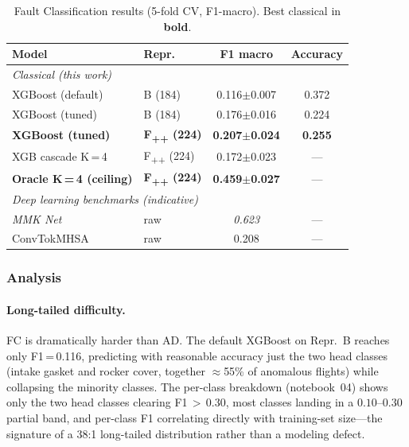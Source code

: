 \begin{table}[H]
    \centering
    \caption{Fault Classification results (5-fold CV, F1-macro). Best classical
             in \textbf{bold}.}
    \label{tab:fc_results}
    \begin{tabular}{llcc}
        \toprule
        \textbf{Model} & \textbf{Repr.} & \textbf{F1 macro} & \textbf{Accuracy} \\
        \midrule
        \multicolumn{4}{l}{\textit{Classical (this work)}} \\
        XGBoost (default)        & B (184)   & 0.116$\pm$0.007 & 0.372 \\
        XGBoost (tuned)          & B (184)   & 0.176$\pm$0.016 & 0.224 \\
        \textbf{XGBoost (tuned)} & \textbf{F\textsubscript{++} (224)} & \textbf{0.207$\pm$0.024} & \textbf{0.255} \\
        XGB cascade K\,=\,4      & F\textsubscript{++} (224) & 0.172$\pm$0.023 & --- \\
        \textbf{Oracle K\,=\,4 (ceiling)} & \textbf{F\textsubscript{++} (224)} & \textbf{0.459$\pm$0.027} & --- \\
        \midrule
        \multicolumn{4}{l}{\textit{Deep learning benchmarks (indicative) \cite{lmsd2025}}} \\
        \textit{MMK Net} & raw & \textit{0.623} & --- \\
        ConvTokMHSA      & raw & 0.208 & --- \\
        \bottomrule
    \end{tabular}
\end{table}

\subsubsection{Analysis}

\paragraph{Long-tailed difficulty.}
FC is dramatically harder than AD. The default XGBoost on Repr.~B reaches only
F1\,=\,0.116, predicting with reasonable accuracy just the two head classes
(intake gasket and rocker cover, together $\approx$55\% of anomalous flights)
while collapsing the minority classes. The per-class breakdown (notebook~04)
shows only the two head classes clearing F1\,$>$\,0.30, most classes landing in a
$0.10$--$0.30$ partial band, and per-class F1 correlating directly with
training-set size---the signature of a 38:1 long-tailed distribution rather than
a modeling defect.

